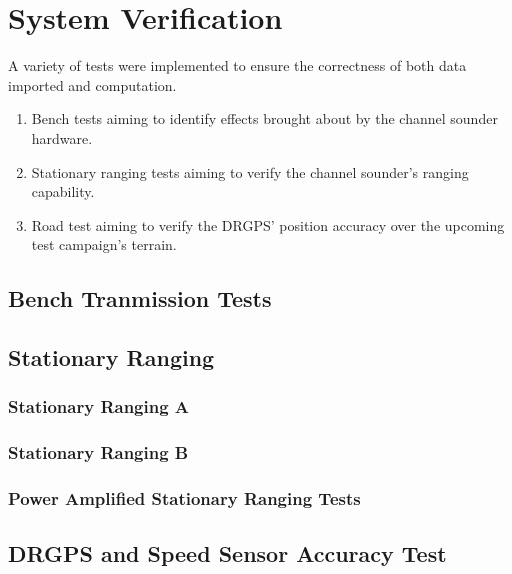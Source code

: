 \chapter{System Verification}\label{sec:verify}
A variety of tests were implemented to ensure the correctness of both data imported and computation.
\begin{enumerate}
   \item Bench tests aiming to identify effects brought about by the channel sounder hardware.
   \item Stationary ranging tests aiming to verify the channel sounder's ranging capability. 
   \item Road test aiming to verify the DRGPS' position accuracy over the upcoming test campaign's terrain.
\end{enumerate}

\section{Bench Tranmission Tests}\label{sec:Verification_BenchTests}

\section{Stationary Ranging}

\subsection{Stationary Ranging A}

\subsection{Stationary Ranging B}

\subsection{Power Amplified Stationary Ranging Tests}

\section{DRGPS and Speed Sensor Accuracy Test}